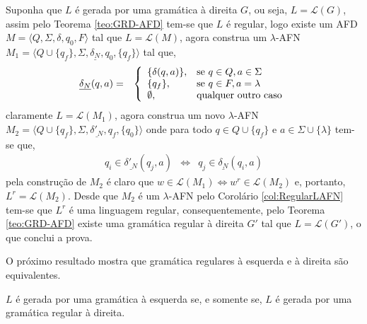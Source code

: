 \begin{prova}
	Suponha que $L$ é gerada por uma gramática à direita $G$, ou seja, $L = \mathcal{L}(G)$, assim pelo Teorema \ref{teo:GRD-AFD} tem-se que $L$ é regular, logo existe um AFD $M = \langle Q, \Sigma, \delta, q_0, F\rangle$ tal que $L = \mathcal{L}(M)$, agora construa um $\lambda$-AFN $M_1 = \langle Q \cup \{q_f\}, \Sigma, \underline{\delta_N}, q_0, \{q_f\}\rangle$ tal que,
	\begin{eqnarray*}
		\underline{\delta_N}(q, a) & = & \left\{\begin{array}{ll}	
			\{\delta(q, a)\}, & \hbox{se } q \in Q, a \in \Sigma\\
			\{q_f\}, & \hbox{se } q \in F, a = \lambda \\
			\emptyset, & \hbox{qualquer outro caso}
		\end{array}\right.
	\end{eqnarray*}
	claramente $L = \mathcal{L}(M_1)$, agora construa um novo $\lambda$-AFN $M_2 = \langle Q \cup \{q_f\}, \Sigma, \underline{\delta'_N}, q_f, \{q_0\}\rangle$ onde para todo $q \in Q \cup \{q_f\}$ e $a \in \Sigma \cup \{\lambda\}$ tem-se que,
	\begin{eqnarray*}
		q_i \in \underline{\delta'_N}(q_j, a) & \Longleftrightarrow & q_j \in \underline{\delta_N}(q_i, a)
	\end{eqnarray*}
	pela construção de $M_2$ é claro que  $w \in \mathcal{L}(M_1) \Longleftrightarrow w^r \in \mathcal{L}(M_2)$ e, portanto, $L^r = \mathcal{L}(M_2)$. Desde que $M_2$ é um $\lambda$-AFN pelo Corolário \ref{col:RegularLAFN} tem-se que $L^r$ é uma linguagem regular, consequentemente, pelo Teorema \ref{teo:GRD-AFD} existe uma gramática regular à direita $G'$ tal que $L = \mathcal{L}(G')$, o que conclui a prova.
\end{prova}

O próximo resultado mostra que gramática regulares à esquerda e à direita são equivalentes.

\begin{teorema}\label{teo:MudacaDeLadoGramatica}
	$L$ é gerada por uma gramática à esquerda se, e somente se, $L$ é gerada por uma gramática regular à direita.
\end{teorema}


